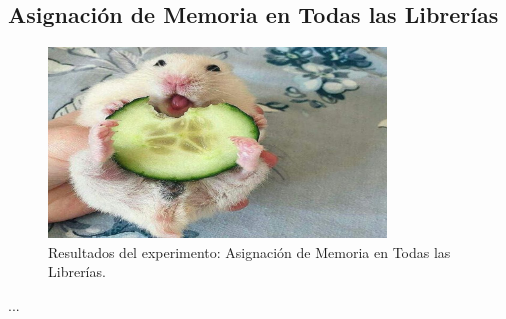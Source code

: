 \subsection{Asignación de Memoria en Todas las Librerías}
\label{exp:all-libs-mem}

\begin{figure}[H]
    \centering
    \includegraphics[width=0.8\textwidth]{testing/images/all_libs_mem.png}
    \caption{Resultados del experimento: Asignación de Memoria en Todas las Librerías.}
    \label{fig:all-libs-mem}
\end{figure}

...
